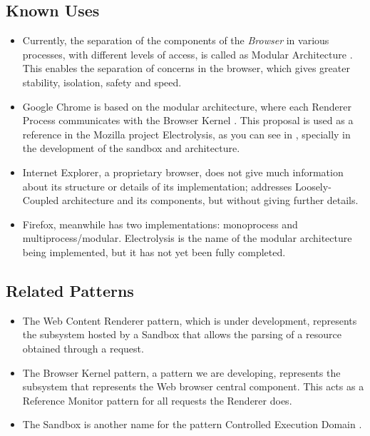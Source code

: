 \documentclass{sig-alternate-05-2015}
\begin{document}
  \subsection*{Known Uses}
  \begin{itemize}
    \item Currently, the separation of the components of the \textit{Browser} in various processes, with different levels of access, is called as Modular Architecture \cite{Vrbanec2013}. This enables the separation of concerns in the browser, which gives greater stability, isolation, safety and speed.
    \item Google Chrome is based on the modular architecture, where each Renderer Process communicates with the Browser Kernel \cite{multiProcGC}. This proposal is used as a reference in the Mozilla project Electrolysis, as you can see in \cite{FirefoxThreatModel,featuresE10S}, specially in the development of the sandbox and architecture.
    \item Internet Explorer, a proprietary browser, does not give much information about its structure or details of its implementation; \cite{Crowley2010} addresses Loosely-Coupled architecture \cite{IE8-LCIE} and its components, but without giving further details. 
    \item Firefox, meanwhile has two implementations: monoprocess and multiprocess/modular. Electrolysis is the name of the modular architecture being implemented, but it has not yet been fully completed.
  \end{itemize}

  \subsection*{Related Patterns}
  \begin{itemize}
    \item The Web Content Renderer pattern, which is under development, represents the subsystem hosted by a Sandbox that allows the parsing of a resource obtained through a request.
    \item The Browser Kernel pattern, a pattern we are developing, represents the subsystem that represents the Web browser central component. This acts as a Reference Monitor pattern \cite{fernandez2013security} for all requests the Renderer does.
    \item The Sandbox is another name for the pattern Controlled Execution Domain \cite{fernandez2013security}.
  \end{itemize}
\end{document}
